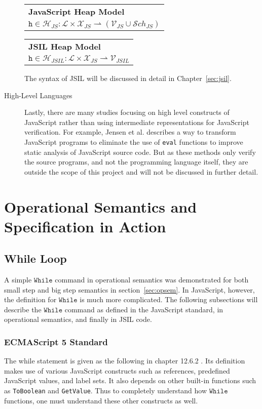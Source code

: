 \documentclass[a4paper,11pt,twoside]{report}
\begin{document}
\begin{description}
\begin{center}
\begin{tabular}{p{9cm}} \hline
\textbf{JavaScript Heap Model} \\
$\texttt{h} \in \mathcal{H}_{JS} : \mathcal{L} \times \mathcal{X}_{JS} \rightharpoonup (\mathcal{V}_{JS} \cup \mathcal{S}ch_{JS})$  \\ \hline
\end{tabular}

\begin{tabular}{p{9cm}} \hline
\textbf{JSIL Heap Model} \\
$\texttt{h} \in \mathcal{H}_{JSIL} : \mathcal{L} \times \mathcal{X}_{JS} \rightharpoonup \mathcal{V}_{JSIL} $  \\ \hline
\end{tabular}
\end{center}

The syntax of JSIL will be discussed in detail in Chapter~\ref{sec:jsil}.

\item[High-Level Languages] Lastly, there are many studies focusing on high level constructs of JavaScript rather than using intermediate representations for JavaScript verification. For example, Jensen et al. \cite{unevalizer2012} describes a way to transform JavaScript programs to eliminate the use of \texttt{eval} functions to improve static analysis of JavaScript source code. But as these methods only verify the source programs, and not the programming language itself, they are outside the scope of this project and will not be discussed in further detail.
\end{description}

\section{Operational Semantics and Specification in Action}
\subsection{While Loop}
A simple $\mathtt{While}$ command in operational semantics was demonstrated for both small step and big step semantics in section~\ref{sec:opsem}. In JavaScript, however, the definition for $\mathtt{While}$ is much more complicated. The following subsections will describe the $\mathtt{While}$ command as defined in the JavaScript standard, in operational semantics, and finally in JSIL code.

\subsubsection{ECMAScript 5 Standard} 
The while statement is given as the following in chapter 12.6.2 \cite{EcmaScript}. Its definition makes use of various JavaScript constructs such as references, predefined JavaScript values, and label sets. It also depends on other built-in functions such as \texttt{ToBoolean} and \texttt{GetValue}. Thus to completely understand how $\mathtt{While}$ functions, one must understand these other constructs as well.
\end{document}

